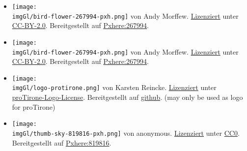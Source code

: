 \begin{itemize}
   \item \texttt{[image: \\imgGl/bird-flower-267994-pxh.png]} von Andy Morffew. \href{https://pxhere.com/en/photo/267994}{Lizenziert} unter \href{https://creativecommons.org/licenses/by/2.0/}{CC-BY-2.0}. Bereitgestellt auf \href{https://pxhere.com/en/photo/267994}{Pxhere:267994}.
   \item \texttt{[image: \\imgGl/bird-flower-267994-pxh.png]} von Andy Morffew. \href{https://pxhere.com/en/photo/267994}{Lizenziert} unter \href{https://creativecommons.org/licenses/by/2.0/}{CC-BY-2.0}. Bereitgestellt auf \href{https://pxhere.com/en/photo/267994}{Pxhere:267994}.
   \item \texttt{[image: \\imgGl/logo-protirone.png]} von Karsten Reincke. \href{https://github.com/kreincke/proTironeComputatri/blob/main/LICENSING.md}{Lizenziert} unter \href{https://github.com/kreincke/proTironeComputatri/blob/main/LICENSING.md}{proTirone-Logo-License}. Bereitgestellt auf \href{https://github.com/kreincke/proTironeComputatri/}{github}. (may only be used as logo for proTirone)
   \item \texttt{[image: \\imgGl/thumb-sky-819816-pxh.png]} von anonymous. \href{https://pxhere.com/en/photo/819816}{Lizenziert} unter \href{https://creativecommons.org/publicdomain/zero/1.0/}{CC0}. Bereitgestellt auf \href{https://pxhere.com/en/photo/819816}{Pxhere:819816}.
\end{itemize}
